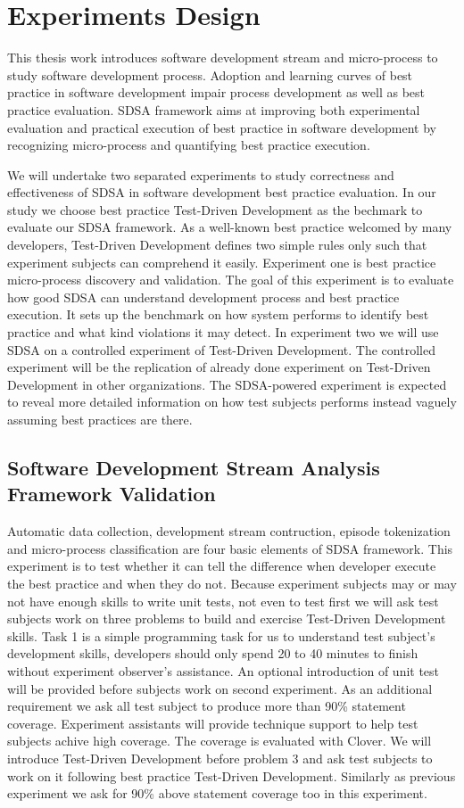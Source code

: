 \chapter{Experiments Design}
\label{chap:Evaluation}
This thesis work introduces software development stream and micro-process
to study software development process. Adoption and learning curves of best
practice in software development impair process development as well as best
practice evaluation. SDSA framework aims at improving both experimental
evaluation and practical execution of best practice in software development
by recognizing micro-process and quantifying best practice execution. 

We will undertake two separated experiments to study correctness and
effectiveness of SDSA in software development best practice evaluation.  In
our study we choose best practice Test-Driven Development as the bechmark
to evaluate our SDSA framework. As a well-known best practice welcomed by
many developers, Test-Driven Development defines two simple rules only such
that experiment subjects can comprehend it easily. Experiment one is best
practice micro-process discovery and validation. The goal of this
experiment is to evaluate how good SDSA can understand development process
and best practice execution. It sets up the benchmark on how system performs
to identify best practice and what kind violations it may detect. In experiment 
two we will use SDSA on a controlled experiment of Test-Driven Development. The
controlled experiment will be the replication of already done experiment on
Test-Driven Development in other organizations. The SDSA-powered experiment
is expected to reveal more detailed information on how test subjects performs
instead vaguely assuming best practices are there. 

\section{Software Development Stream Analysis Framework Validation}
Automatic data collection, development stream contruction, episode
tokenization and micro-process classification are four basic elements of
SDSA framework. This experiment is to test whether it can tell the
difference when developer execute the best practice and when they do not.
Because experiment subjects may or may not have enough skills to write unit
tests, not even to test first we will ask test subjects work on three
problems to build and exercise Test-Driven Development skills. Task 1 is a
simple programming task for us to understand test subject's development
skills, developers should only spend 20 to 40 minutes to finish without
experiment observer's assistance. An optional introduction of unit test
will be provided before subjects work on second experiment. As an
additional requirement we ask all test subject to produce more than 90\%
statement coverage. Experiment assistants will provide technique support to
help test subjects achive high coverage. The coverage is evaluated with
Clover. We will introduce Test-Driven Development before problem 3 and ask
test subjects to work on it following best practice Test-Driven
Development. Similarly as previous experiment we ask for 90\% above
statement coverage too in this experiment.


